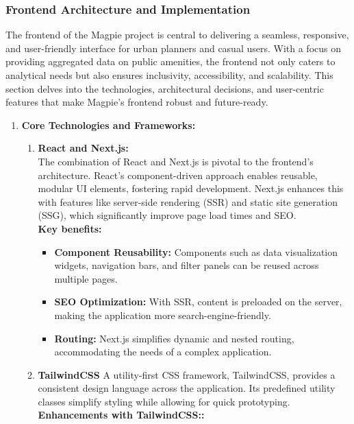 \subsubsection{Frontend Architecture and Implementation}
The frontend of the Magpie project is central to delivering a seamless, responsive, and user-friendly interface for urban planners and casual users. With a focus on providing aggregated data on public amenities, the frontend not only caters to analytical needs but also ensures inclusivity, accessibility, and scalability. This section delves into the technologies, architectural decisions, and user-centric features that make Magpie’s frontend robust and future-ready.

\begin{enumerate}
    \item \textbf{Core Technologies and Frameworks:}
    \begin{enumerate}
        \item \textbf{React and Next.js:} \\
        The combination of React and Next.js is pivotal to the frontend's architecture. React's component-driven approach enables reusable, modular UI elements, fostering rapid development. Next.js enhances this with features like server-side rendering (SSR) and static site generation (SSG), which significantly improve page load times and SEO.\\
        \linebreak
        \textbf{Key benefits: }
        \begin{itemize}
            \item \textbf{Component Reusability:} Components such as data visualization widgets, navigation bars, and filter panels can be reused across multiple pages.
            \item \textbf{SEO Optimization:} With SSR, content is preloaded on the server, making the application more search-engine-friendly.
            \item \textbf{Routing:} Next.js simplifies dynamic and nested routing, accommodating the needs of a complex application.
        \end{itemize}
        \item \textbf{TailwindCSS}
        A utility-first CSS framework, TailwindCSS, provides a consistent design language across the application. Its predefined utility classes simplify styling while allowing for quick prototyping. 
        \textbf{Enhancements with TailwindCSS:: }
        \begin{itemize}

\end{itemize}
\end{enumerate}
\end{enumerate}
